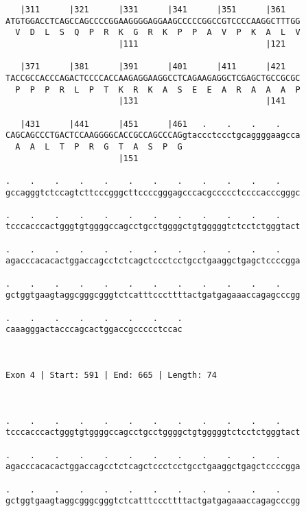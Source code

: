 \documentclass{article}
\begin{document}
\begin{Verbatim}
   |311      |321      |331      |341      |351      |361   
ATGTGGACCTCAGCCAGCCCCGGAAGGGGAGGAAGCCCCCGGCCGTCCCCAAGGCTTTGG
  V  D  L  S  Q  P  R  K  G  R  K  P  P  A  V  P  K  A  L  V
                       |111                          |121   
  
   |371      |381      |391      |401      |411      |421   
TACCGCCACCCAGACTCCCCACCAAGAGGAAGGCCTCAGAAGAGGCTCGAGCTGCCGCGC
  P  P  P  R  L  P  T  K  R  K  A  S  E  E  A  R  A  A  A  P
                       |131                          |141   
  
   |431      |441      |451      |461   .    .    .    .    
CAGCAGCCCTGACTCCAAGGGGCACCGCCAGCCCAGgtaccctccctgcaggggaagcca
  A  A  L  T  P  R  G  T  A  S  P  G                        
                       |151                                 
  
.    .    .    .    .    .    .    .    .    .    .    .    
gccagggtctccagtcttcccgggcttccccgggagcccacgccccctccccacccgggc
                                                            
.    .    .    .    .    .    .    .    .    .    .    .    
tcccacccactgggtgtggggccagcctgcctggggctgtgggggtctcctctgggtact
                                                            
.    .    .    .    .    .    .    .    .    .    .    .    
agacccacacactggaccagcctctcagctccctcctgcctgaaggctgagctccccgga
                                                            
.    .    .    .    .    .    .    .    .    .    .    .    
gctggtgaagtaggcgggcgggtctcatttcccttttactgatgagaaaccagagcccgg
                                                            
.    .    .    .    .    .    .    .
caaagggactacccagcactggaccgccccctccac
                                    
                                    
 
Exon 4 | Start: 591 | End: 665 | Length: 74



.    .    .    .    .    .    .    .    .    .    .    .    
tcccacccactgggtgtggggccagcctgcctggggctgtgggggtctcctctgggtact
                                                            
.    .    .    .    .    .    .    .    .    .    .    .    
agacccacacactggaccagcctctcagctccctcctgcctgaaggctgagctccccgga
                                                            
.    .    .    .    .    .    .    .    .    .    .    .    
gctggtgaagtaggcgggcgggtctcatttcccttttactgatgagaaaccagagcccgg
                                                            

\end{Verbatim}
\end{document}
